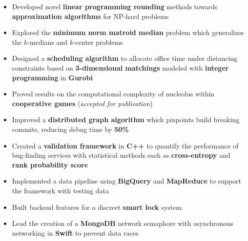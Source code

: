 \documentclass[11pt,a4paper]{altacv}
\begin{document}
\begin{paracol}{2}
\makecvheader

\begin{itemize}
    \item Developed novel \textbf{linear programming rounding} methods
      towards \textbf{approximation algorithms} for NP-hard problems
    \item Explored the \textbf{minimum norm matroid median} problem
      which generalizes the $k$-medians and $k$-center problems
\end{itemize}

\divider %

\begin{itemize}
    \item Designed a \textbf{scheduling algorithm} to allocate office time under distancing constraints
      based on \textbf{3-dimensional matchings} modeled with \textbf{integer programming} in \textbf{Gurobi}
    \item Proved results on the computational complexity of nucleolus
      within \textbf{cooperative games}
      (\emph{accepted for publication})
\end{itemize}

\divider

\begin{itemize}
    \item Improved a \textbf{distributed graph algorithm} which pinpoints build breaking commits,
      reducing debug time by \textbf{50\%}
    \item Created a \textbf{validation framework} in \textbf{C++}
      to quantify the performance of bug-finding services
      with statistical methods such as \textbf{cross-entropy} and \textbf{rank probability score}
    \item Implemented a data pipeline using \textbf{BigQuery} and \textbf{MapReduce}
      to support the framework with testing data
\end{itemize}

\divider

\begin{itemize}
    \item Built backend features for a discreet \textbf{smart lock} system
    \item Lead the creation of a \textbf{MongoDB} network semaphore with asynchronous networking in \textbf{Swift}
      to prevent data races
\end{itemize}


\end{paracol}
\end{document}
